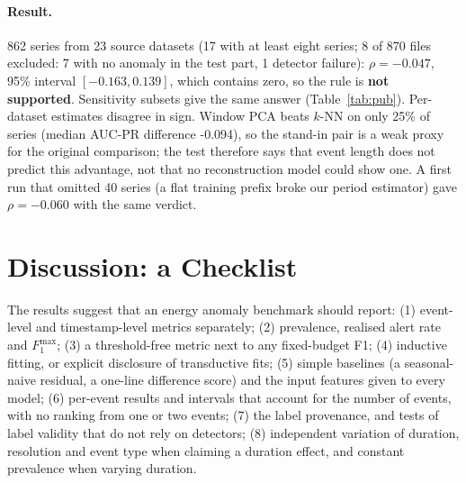 \documentclass[10pt,twocolumn]{article}
\newcommand{\F}{F_1}
\begin{document}
\paragraph{Result.} 862 series from 23 source datasets (17 with at least eight series; 8 of 870 files excluded: 7 with no anomaly in the test part, 1 detector failure): $\rho=-0.047$, 95\% interval $[-0.163, 0.139]$, which contains zero, so the rule is \textbf{not supported}. Sensitivity subsets give the same answer (Table~\ref{tab:pub}). Per-dataset estimates disagree in sign. Window PCA beats $k$-NN on only 25\% of series (median AUC-PR difference -0.094), so the stand-in pair is a weak proxy for the original comparison; the test therefore says that event length does not predict this advantage, not that no reconstruction model could show one. A first run that omitted 40 series (a flat training prefix broke our period estimator) gave $\rho=-0.060$ with the same verdict.

\begin{table}[t]
\centering\scriptsize

\caption{Primary test and exploratory sensitivity subsets (same statistic). ``Clean training prefix'' excludes series with anomalies inside the training prefix (171 of 862 have some).}\label{tab:pub}
\end{table}

\section{Discussion: a Checklist}
The results suggest that an energy anomaly benchmark should report: (1) event-level and timestamp-level metrics separately; (2) prevalence, realised alert rate and $\F^{\max}$; (3) a threshold-free metric next to any fixed-budget F1; (4) inductive fitting, or explicit disclosure of transductive fits; (5) simple baselines (a seasonal-naive residual, a one-line difference score) and the input features given to every model; (6) per-event results and intervals that account for the number of events, with no ranking from one or two events; (7) the label provenance, and tests of label validity that do not rely on detectors; (8) independent variation of duration, resolution and event type when claiming a duration effect, and constant prevalence when varying duration.
\end{document}
